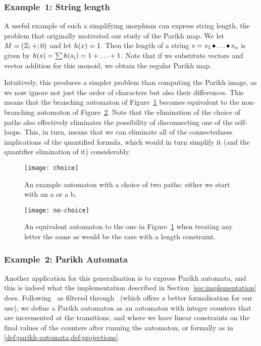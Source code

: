 \documentclass[acmsmall,review,anonymous,screen]{acmart}\settopmatter{printfolios=true,printccs=false,printacmref=true}
\theoremstyle{definition}
\newif\ifoutline
\newcommand{\contents}[1]{\ifoutline{\color{blue}
    \begin{itemize}
    #1
    \end{itemize}
  }\fi}
\begin{document}
\subsubsection{Example~1: String length}

A useful example of such a simplifying morphism can express string length, the
problem that originally motivated our study of the Parikh map. We let $M =
\left(\mathbb{Z};+;0\right)$ and let $h(x) = 1$. Then the length of a string
$s = s_1 \operatorname{\bullet} \ldots \operatorname{\bullet}  s_n$ is given by $h(s) = \sum h(s_i) = 1
+ \ldots + 1$. Note that if we substitute vectors and vector addition for
this monoid, we obtain the regular Parikh map.

Intuitively, this produces a simpler problem than computing the Parikh image, as
we now ignore not just the order of characters but also their differences. This
means that the branching automaton of Figure~\ref{fig:len-branch} becomes
equivalent to the non-branching automaton of Figure~\ref{fig:len-branch-free}.
Note that the elimination of the choice of paths also effectively eliminates the
possibility of disconnecting one of the self-loops. This, in turn, means that we
can eliminate all of the connectedness implications of the quantified formula,
which would in turn simplify it (and the quantifier elimination of it)
considerably.

\begin{figure}
  \texttt{[image: choice]}
  \caption{An example automaton with a choice of two paths: either we start with an a or a b.}
  \label{fig:len-branch}
\end{figure}

\begin{figure}
  \texttt{[image: no-choice]}
  \caption{An equivalent automaton to the one in Figure~\ref{fig:len-branch}
  when treating any letter the same as would be the case with a length
  constraint.}\label{fig:len-branch-free}
\end{figure}


\contents{
  \item Formally analyse the complexity of how much easier the length problem is
}


\subsubsection{Example~2: Parikh Automata}\label{sec:parikh-automata}

Another application for this generalisation is to express Parikh automata, and
this is indeed what the implementation described in
Section~\ref{sec:implementation} does. Following~\cite{parikh-automata} as
filtered through~\cite{expressiveness} (which offers a better formalisation for
our use), we define a Parikh automaton as an automaton with integer counters
that are incremented at the transitions, and where we have linear
constraints on the final values of the counters after running the automaton, or
formally as in \cref{def:parikh-automata,def:projections}.
\end{document}
